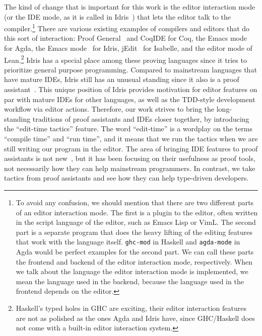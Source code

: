 The kind of change that is important for this work is the editor
interaction mode (or the IDE mode, as it is called in Idris~\cite{idris}) that
lets the editor talk to the compiler.\footnote{To avoid any confusion,
we should mention that there are two different parts of an editor interaction
mode. The first is a plugin to the editor, often written in the script language
of the editor, such as Emacs Lisp or VimL. The second part is a separate
program that does the heavy lifting of the editing features that work with the
language itself.  \texttt{ghc-mod} in Haskell and \texttt{agda-mode} in Agda would
be perfect examples for the second part. We can call these parts the frontend
and backend of the editor interaction mode, respectively.  When we talk about
the language the editor interaction mode is implemented, we mean the language
used in the backend, because the language used in the frontend depends on the
editor.}
There are various existing examples of compilers and editors that do this sort
of interaction:
Proof General~\cite{pg} and CoqIDE for Coq,
the Emacs mode~\cite{agdamode} for Agda,
the Emacs mode~\cite{idrismode} for Idris,
jEdit~\cite{isabellejedit} for Isabelle,
and the editor mode of Lean.\footnote{Haskell's typed holes in GHC
are exciting, their editor interaction features are not as polished as the ones
Agda and Idris have, since GHC/Haskell does not come with a built-in editor
interaction system.}
Idris has a special place among these proving languages since it tries to
prioritize general purpose programming. Compared to mainstream languages
that have mature IDEs, Idris still has an unusual standing since it also is a
proof assistant~\cite{idrisfaq}.
This unique position of Idris provides motivation for editor features on par
with mature IDEs for other languages, as well as the TDD-style development
workflow via editor actions.
Therefore, our work strives to bring the long-standing traditions of proof
assistants and IDEs closer together, by introducing the ``edit-time tactics''
feature.  The word ``edit-time'' is a wordplay on the terms ``compile time''
and ``run time'', and it means that we run the tactics when we are still
writing our program in the editor.
The area of bringing IDE features to proof assistants is not new~\cite{ctcoq,
developingReuse, realTheoremProvers, toolSupport}, but it has been focusing
on their usefulness as proof tools, not necessarily how they can help
mainstream programmers. In contrast, we take tactics from proof assistants
and see how they can help type-driven developers.

